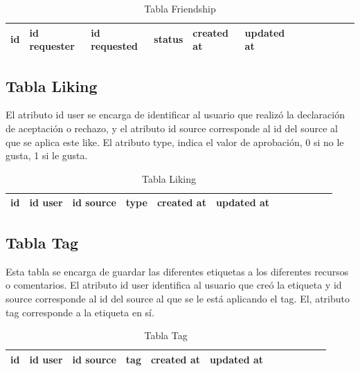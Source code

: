\documentclass[12pt,letterpaper]{article}
\begin{document}
\begin{table}[!ht]  
\begin{center}	
	\begin{tabular}{||c|l|l|l|l|l|l|l|l|l|l|l||} \hline 
	id & id requester & id requested & status & created at & updated at \\ \hline
	\end{tabular}
	\caption {Tabla Friendship}
\end{center}  
\end{table}

\subsection{Tabla Liking}
El atributo id user se encarga de identificar al usuario que realizó la declaración de aceptación o rechazo, y el atributo id source corresponde al id del source al que se aplica este like. El atributo type, indica el valor de aprobación, 0 si no le gusta, 1 si le gusta.

\begin{table}[!ht]  
\begin{center}	
	\begin{tabular}{||c|l|l|l|l|l|l|l|l|l|l|l||} \hline 
	id & id user & id source & type & created at & updated at \\ \hline
	\end{tabular}
	\caption {Tabla Liking}
\end{center}  
\end{table}

\subsection{Tabla Tag}
Esta tabla se encarga de guardar las diferentes etiquetas a los diferentes recursos o comentarios. El atributo id user identifica al usuario que creó la etiqueta y id source corresponde al id del source al que se le está aplicando el tag. El, atributo tag corresponde a la etiqueta en sí.

\begin{table}[!ht]  
\begin{center}	
	\begin{tabular}{||c|l|l|l|l|l|l|l|l|l|l|l||} \hline 
	id & id user & id source & tag & created at & updated at \\ \hline
	\end{tabular}
	\caption {Tabla Tag}
\end{center}  
\end{table}
\end{document}
